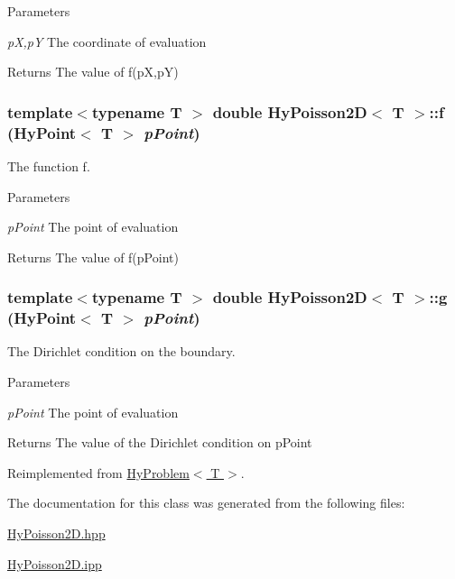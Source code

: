 \begin{DoxyParams}{Parameters}
\item[{\em pX,pY}]The coordinate of evaluation \end{DoxyParams}
\begin{DoxyReturn}{Returns}
The value of f(pX,pY) 
\end{DoxyReturn}
\hypertarget{classHyPoisson2D_ace05fcef4dbe0fe29c1357f7b0eeed23}{
\subsubsection[{f}]{\setlength{\rightskip}{0pt plus 5cm}template$<$typename T $>$ double {\bf HyPoisson2D}$<$ T $>$::f ({\bf HyPoint}$<$ T $>$ {\em pPoint})}}
\label{classHyPoisson2D_ace05fcef4dbe0fe29c1357f7b0eeed23}


The function f. 


\begin{DoxyParams}{Parameters}
\item[{\em pPoint}]The point of evaluation \end{DoxyParams}
\begin{DoxyReturn}{Returns}
The value of f(pPoint) 
\end{DoxyReturn}
\hypertarget{classHyPoisson2D_a9c27e90e3abb3a6ebe5d6b3274412e7a}{
\subsubsection[{g}]{\setlength{\rightskip}{0pt plus 5cm}template$<$typename T $>$ double {\bf HyPoisson2D}$<$ T $>$::g ({\bf HyPoint}$<$ T $>$ {\em pPoint})}}
\label{classHyPoisson2D_a9c27e90e3abb3a6ebe5d6b3274412e7a}


The Dirichlet condition on the boundary. 


\begin{DoxyParams}{Parameters}
\item[{\em pPoint}]The point of evaluation \end{DoxyParams}
\begin{DoxyReturn}{Returns}
The value of the Dirichlet condition on pPoint 
\end{DoxyReturn}


Reimplemented from \hyperlink{classHyProblem_a5d3b78c69811136e74e9fc9232cc110b}{HyProblem$<$ T $>$}.



The documentation for this class was generated from the following files:\begin{DoxyCompactItemize}
\item 
\hyperlink{HyPoisson2D_8hpp}{HyPoisson2D.hpp}\item 
\hyperlink{HyPoisson2D_8ipp}{HyPoisson2D.ipp}\end{DoxyCompactItemize}
